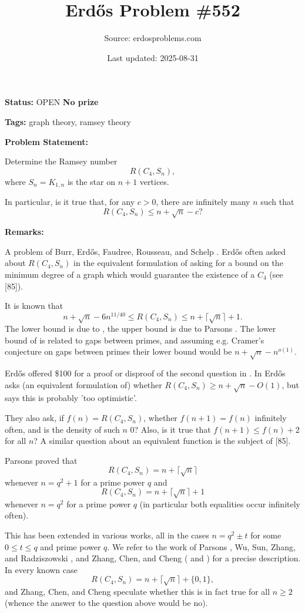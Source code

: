 \documentclass{article}
\title{Erd\H{o}s Problem \#552}
\date{Last updated: 2025-08-31}
\author{Source: erdosproblems.com}
\begin{document}
\maketitle

\noindent\textbf{Status:} OPEN \quad \textbf{No prize}

\noindent\textbf{Tags:} graph theory, ramsey theory

\medskip
\noindent\textbf{Problem Statement:}

Determine the Ramsey number\[R(C_4,S_n),\]where $S_n=K_{1,n}$ is the star on $n+1$ vertices.

In particular, is it true that, for any $c>0$, there are infinitely many $n$ such that\[R(C_4,S_n)\leq n+\sqrt{n}-c?\]

\bigskip
\noindent\textbf{Remarks:}

A problem of Burr, Erd\H{o}s, Faudree, Rousseau, and Schelp \cite{BEFRS89}. Erd\H{o}s often asked about $R(C_4,S_n)$ in the equivalent formulation of asking for a bound on the minimum degree of a graph which would guarantee the existence of a $C_4$ (see [85]).

It is known that\[ n+\sqrt{n}-6n^{11/40} \leq R(C_4,S_n)\leq n+\lceil\sqrt{n}\rceil+1.\]The lower bound is due to \cite{BEFRS89}, the upper bound is due to Parsons \cite{Pa75}. The lower bound of \cite{BEFRS89} is related to gaps between primes, and assuming e.g. Cramer's conjecture on gaps between primes their lower bound would be $n+\sqrt{n}-n^{o(1)}$.

Erd\H{o}s offered \$100 for a proof or disproof of the second question in \cite{BEFRS89}. In \cite{Er96} Erd\H{o}s asks (an equivalent formulation of) whether $R(C_4,S_n)\geq n+\sqrt{n}-O(1)$, but says this is probably 'too optimistic'.

They also ask, if $f(n)=R(C_4,S_n)$, whether $f(n+1)=f(n)$ infinitely often, and is the density of such $n$ $0$? Also, is it true that $f(n+1)\leq f(n)+2$ for all $n$? A similar question about an equivalent function is the subject of [85].

Parsons \cite{Pa75} proved that\[R(C_4,S_n)=n+\lceil\sqrt{n}\rceil\]whenever $n=q^2+1$ for a prime power $q$ and\[R(C_4,S_n)=n+\lceil\sqrt{n}\rceil+1\]whenever $n=q^2$ for a prime power $q$ (in particular both equalities occur infinitely often).

This has been extended in various works, all in the cases $n=q^2\pm t$ for some $0\leq t\leq q$ and prime power $q$. We refer to the work of Parsons \cite{Pa75}, Wu, Sun, Zhang, and Radziszowski \cite{WSZR15}, and Zhang, Chen, and Cheng (\cite{ZCC17} and \cite{ZCC17b}) for a precise description. In every known case\[R(C_4,S_n)=n+\lceil\sqrt{n}\rceil+\{0,1\},\]and Zhang, Chen, and Cheng \cite{ZCC17} speculate whether this is in fact true for all $n\geq 2$ (whence the answer to the question above would be no).
\end{document}
